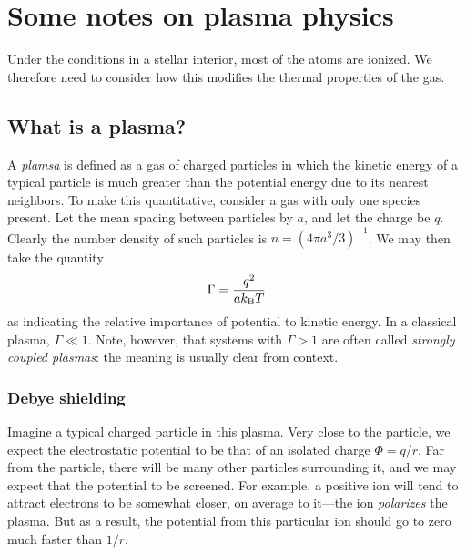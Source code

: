 \chapter{Some notes on plasma physics}
\newcommand{\lambdaD}{\ensuremath{\lambda_{\mathrm{D}}}}
\newcommand{\abohr}{\ensuremath{a_{\mathrm{B}}}}

Under the conditions in a stellar interior, most of the atoms are ionized. We therefore need to consider how this modifies the thermal properties of the gas.

\section{What is a plasma?}\label{s.what-is-plasma}

A \emph{plamsa} is defined as a gas of charged particles in which the kinetic energy of a typical particle is much greater than the potential energy due to its nearest neighbors. To make this quantitative, consider a gas with only one species present.  Let the mean spacing between particles by $a$, and let the charge be $q$.  Clearly the number density of such particles is $n = (4\pi a^{3}/3)^{-1}$.  We may then take the quantity
\begin{equation}\label{e.Gamma-definition}
\Gamma = \frac{q^{2}}{ak_\mathrm{B} T}
\end{equation}
as indicating the relative importance of potential to kinetic energy.  In a classical plasma, $\Gamma \ll 1$.  Note, however, that systems with $\Gamma > 1$ are often called \emph{strongly coupled plasmas}: the meaning is usually clear from context.

\subsection{Debye shielding}\label{s.plasma-shielding}

Imagine a typical charged particle in this plasma.  Very close to the particle, we expect the electrostatic potential to be that of an isolated charge $\Phi = q/r$. Far from the particle, there will be many other particles surrounding it, and we may expect that the potential to be screened. For example, a positive ion will tend to attract electrons to be somewhat closer, on average to it---the ion \emph{polarizes} the plasma.  But as a result, the potential from this particular ion should go to zero much faster than $1/r$.


